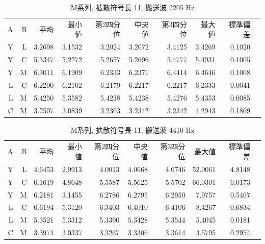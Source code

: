 \begin{table}[p]\centering
  \caption{M系列, 拡散符号長 11, 搬送波 2205 Hz}
  \label{tab:hikaku19}
  \begin{tabular}{rrrrrrrrrr}
    \hline
     A & B & 平均 & 最小値 & 第2四分位 & 中央値 & 第3四分位 & 最大値 & 標準偏差 \\
     Y & L & 3.2698 & 3.1532 & 3.2024 & 3.2072 & 3.4125 & 3.4269 & 0.1020 \\
     Y & C & 5.3347 & 5.2272 & 5.2657 & 5.2696 & 5.4777 & 5.4931 & 0.1005 \\
     Y & M & 6.3011 & 6.1909 & 6.2333 & 6.2371 & 6.4414 & 6.4646 & 0.1008 \\
     L & C & 6.2200 & 6.2102 & 6.2179 & 6.2217 & 6.2217 & 6.2333 & 0.0041 \\
     L & M & 5.4250 & 5.3582 & 5.4238 & 5.4238 & 5.4276 & 5.4353 & 0.0085 \\
     C & M & 3.2507 & 3.0839 & 3.2303 & 3.2342 & 3.2342 & 4.2943 & 0.1869 \\
    \hline
  \end{tabular}
\end{table}

\begin{table}[p]\centering
  \caption{M系列, 拡散符号長 11, 搬送波 4410 Hz}
  \label{tab:hikaku20}
  \begin{tabular}{rrrrrrrrrr}
    \hline
     A & B & 平均 & 最小値 & 第2四分位 & 中央値 & 第3四分位 & 最大値 & 標準偏差 \\
     Y & L & 4.6453 & 2.9913 & 4.0013 & 4.0668 & 4.0746 & 52.0061 & 4.8148 \\
     Y & C & 6.1619 & 4.8648 & 5.5587 & 5.5625 & 5.5702 & 66.0301 & 6.0173 \\
     Y & M & 6.2181 & 3.1455 & 6.2786 & 6.2795 & 6.2950 & 7.9757 & 0.5407 \\
     L & C & 6.6194 & 5.3120 & 6.3403 & 6.4010 & 6.4106 & 8.4267 & 0.6834 \\
     L & M & 5.3521 & 5.3312 & 5.3390 & 5.3428 & 5.3544 & 5.4045 & 0.0181 \\
     C & M & 3.3974 & 3.0337 & 3.3267 & 3.3306 & 3.3614 & 4.5795 & 0.2954 \\
    \hline
  \end{tabular}
\end{table}

